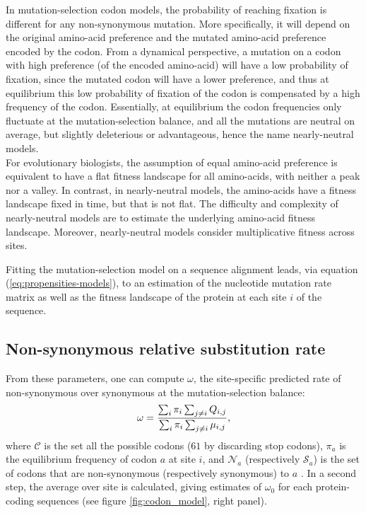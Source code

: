 In mutation-selection \gls{codon} models, the probability of reaching fixation is different for any non-synonymous mutation.
More specifically, it will depend on the original amino-acid preference and the mutated amino-acid preference encoded by the \gls{codon}.
From a dynamical perspective, a mutation on a \gls{codon} with high preference (of the encoded amino-acid) will have a low probability of fixation, since the mutated \gls{codon} will have a lower preference, and thus at equilibrium this low probability of fixation of the \gls{codon} is compensated by a high frequency of the \gls{codon}.
Essentially, at equilibrium the \gls{codon} frequencies only fluctuate at the mutation-selection balance, and all the mutations are \gls{neutral} on average, but slightly deleterious or advantageous, hence the name \gls{nearly-neutral} models.\\
For evolutionary biologists, the assumption of equal amino-acid preference is equivalent to have a flat fitness landscape for all amino-acids, with neither a peak nor a valley.
In contrast, in \gls{nearly-neutral} models, the amino-acids have a fitness landscape fixed in time, but that is not flat.
The difficulty and complexity of \gls{nearly-neutral} models are to estimate the underlying amino-acid fitness landscape.
Moreover, \gls{nearly-neutral} models consider multiplicative fitness across sites.


Fitting the mutation-selection model on a sequence alignment leads, via equation (\ref{eq:propensities-models}), to an estimation of the nucleotide mutation rate matrix as well as the fitness landscape of the protein at each site $i$ of the sequence. 

\subsection{Non-synonymous relative \gls{substitution} rate}
From these parameters, one can compute $\omega$, the site-specific predicted rate of non-synonymous over \gls{synonymous} at the mutation-selection balance: 
\begin{equation}
\omega = \dfrac{ \sum_{i} \pi_{i} \sum_{j \neq i } Q_{{i}, {j}}}{\sum_{i} \pi_{i} \sum_{j \neq i } \mu_{{i}, {j}}},
\end{equation}
where $\mathcal{C}$ is the set all the possible codons ($61$ by discarding stop codons), $\pi_a$ is the equilibrium frequency of \gls{codon} $a$ at site $i$, and $\mathcal{N}_a$ (respectively $\mathcal{S}_a$) is the set of codons that are non-synonymous (respectively synonymous) to $a$  \citep{spielman_relationship_2015, rodrigue_site-heterogeneous_2014}. In a second step, the average over site is calculated, giving estimates of $\omega_0$ for each protein-coding sequences (see figure \ref{fig:codon_model}, right panel). \\

